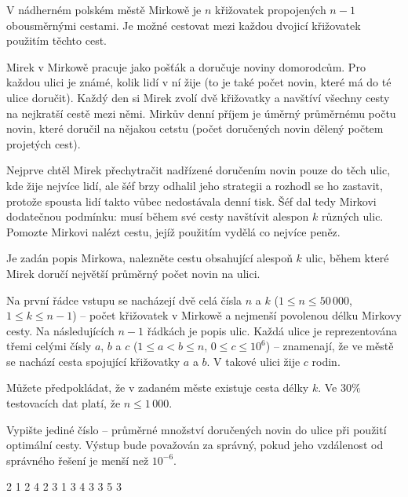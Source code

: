 





V nádherném polském městě Mirkowě je $n$ křižovatek propojených $n - 1$
obousměrnými cestami.
Je možné cestovat mezi každou dvojicí křižovatek použitím těchto cest.

Mirek v Mirkowě pracuje jako pošťák a doručuje noviny domorodcům.
Pro každou ulici je známé, kolik lidí v ní žije
(to je také počet novin, které má do té ulice doručit).
Každý den si Mirek zvolí dvě křižovatky a navštíví všechny cesty na nejkratší
cestě mezi němi. Mirkův denní příjem je úměrný průměrnému počtu novin, které
doručil na nějakou cetstu
(počet doručených novin dělený počtem projetých cest).

Nejprve chtěl Mirek přechytračit nadřízené doručením novin pouze do těch ulic,
kde žije nejvíce lidí, ale šéf brzy odhalil jeho strategii a rozhodl se ho zastavit,
protože spousta lidí takto vůbec nedostávala denní tisk.
Šéf dal tedy Mirkovi dodatečnou podmínku: musí během své cesty navštívit
alespon $k$ různých ulic.
Pomozte Mirkovi nalézt cestu, jejíž použitím vydělá co nejvíce peněz.


Je zadán popis Mirkowa, nalezněte cestu obsahující alespoň $k$ ulic,
během které Mirek doručí největší průměrný počet novin na ulici.


Na první řádce vstupu se nacházejí dvě celá čísla $n$ a $k$
($1 \le n \le 50\,000$, $1 \le k \le n - 1$)
-- počet křižovatek v Mirkowě a nejmenší povolenou délku Mirkovy cesty.
Na následujících $n-1$ řádkách je popis ulic.
Každá ulice je reprezentována třemi celými čísly $a$, $b$ a $c$
($1 \le a < b \le n$, $0 \le c \le 10^6$)
-- znamenají, že ve městě se nachází cesta spojující křižovatky $a$ a $b$. V takové ulici žije $c$ rodin.

Můžete předpokládat, že v zadaném měste existuje cesta délky $k$.
\smallskip
Ve $30\%$ testovacích dat platí, že  $n \le 1\,000$.


Vypište jediné číslo -- průměrné množství doručených novin do ulice při použití
optimální cesty.
Výstup bude považován za správný, pokud jeho vzdálenost od správného řešení
je menší než $10^{-6}$.


 2
1 2 4
2 3 1
3 4 3
3 5 3
\sampleEND


